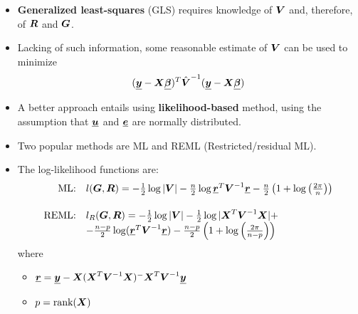 \begin{frame}
  \begin{itemize}
    \vspace{0.25cm}
    \item \textbf{Generalized least-squares} (GLS) requires knowledge of $ \boldsymbol{V} $ and, therefore, of $ \boldsymbol{R} $ and $ \boldsymbol{G} $.
    \vspace{0.25cm}
    \item Lacking of such information, some reasonable estimate of $ \boldsymbol{V} $ can be used to minimize
      $$ (\boldsymbol{\underline{y}} - \boldsymbol{X} \boldsymbol{\underline{\beta}})^T \hat{\boldsymbol{V}}^{-1} (\boldsymbol{\underline{y}} - \boldsymbol{X} \boldsymbol{\underline{\beta}}) $$
    \vspace{0.25cm}
    \item A better approach entails using \textbf{likelihood-based} method, using the assumption that $ \boldsymbol{\underline{u}} $ and $ \boldsymbol{\underline{e}} $ are normally distributed.
    \vspace{0.25cm}
    \item Two popular methods are ML and REML (Restricted/residual ML).
  \end{itemize}
\end{frame}

\begin{frame}
  \begin{itemize}
    \vspace{0.5cm}
    \item The log-likelihood functions are:
      $$ 
          \begin{array}{rl} 
            \vspace{0.5cm}
            \text{ML:} & l(\matr{G}, \matr{R}) = - \frac{1}{2} \log|\matr{V}| - \frac{n}{2} \log \vect{r}^T \matr{V}^{-1} \vect{r} - \frac{n}{2} \left( 1 + \log \left( \frac{2\pi}{n} \right) \right) \\
            \text{REML:} & l_R(\matr{G}, \matr{R}) = - \frac{1}{2} \log|\matr{V}| - \frac{1}{2} \log|\matr{X}^T \matr{V}^{-1} \matr{X}| + \\
                         & - \frac{n-p}{2} \log ( \vect{r}^T \matr{V}^{-1} \vect{r} ) - \frac{n-p}{2} \left(1 + \log \left( \frac{2\pi}{n-p} \right) \right) \\
          \end{array}  
      $$ 
      where
      \begin{itemize}
        \item $ \boldsymbol{\underline{r}} = \boldsymbol{\underline{y}} - \boldsymbol{X} ( \boldsymbol{X}^T \boldsymbol{V}^{-1} \boldsymbol{X} )^{-} \boldsymbol{X}^T \boldsymbol{V}^{-1} \boldsymbol{\underline{y}} $
        \vspace{0.25cm}
        \item $ p = \text{rank}(\boldsymbol{X}) $
      \end{itemize}
  \end{itemize}
\end{frame}



